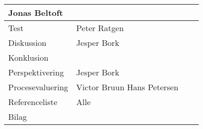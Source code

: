 \begin{table}[h!]
\begin{tabular}{|p{45mm}|p{26mm}|p{26mm}|p{26mm}|}
                                 Jonas Beltoft    &          &  \\ \hline
        Test                   & Peter Ratgen     &          &  \\ \hline
        Diskussion             & Jesper Bork      &          &  \\ \hline
        Konklusion             &                  &          &  \\ \hline
        Perspektivering        & Jesper Bork      &          &  \\ \hline
        Procesevaluering       & Victor Bruun \newline
                                 Hans Petersen    &          &  \\ \hline
        Referenceliste         & Alle             &          &  \\ \hline
        Bilag                  &                  &          &  \\ \hline
    \end{tabular}
\end{table}

\clearpage
